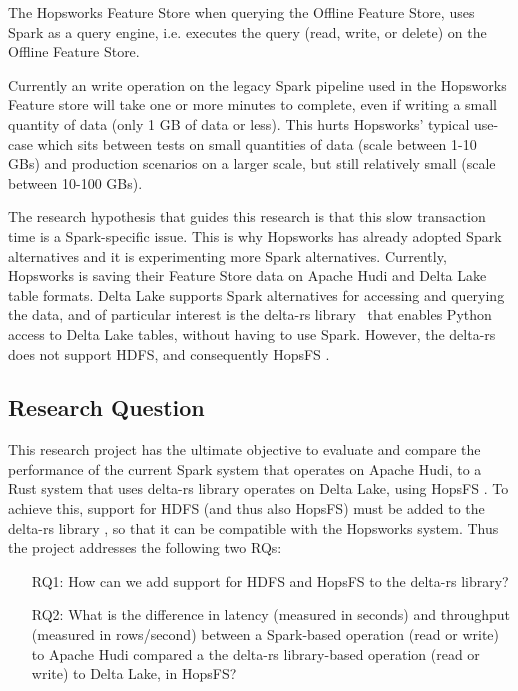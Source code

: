 The Hopsworks Feature Store \cite{HopsworksBatchRealtime2024} when querying the Offline Feature Store, uses Spark as a query engine, i.e. executes the query (read, write, or delete) on the Offline Feature Store.

Currently an write operation on the legacy Spark pipeline used in the Hopsworks Feature store will take one or more minutes to complete, even if writing a small quantity of data (only 1 GB of data or less).
This hurts Hopsworks' typical use-case which sits between tests on small quantities of data (scale between 1-10 GBs) and production scenarios on a larger scale, but still relatively small (scale between 10-100 GBs).

The research hypothesis that guides this research is that this slow transaction time is a Spark-specific issue. This is why Hopsworks has already adopted Spark alternatives \cite{Khazanchi1801362} and it is experimenting more Spark alternatives. Currently, Hopsworks is saving their Feature Store data on Apache Hudi and Delta Lake table formats. Delta Lake supports Spark alternatives for accessing and querying the data, and of particular interest is the delta-rs library~\cite{DeltaioDeltars2024} that enables Python access to Delta Lake tables, without having to use Spark. 
However, the delta-rs \cite{DeltaioDeltars2024} does not support \gls{HDFS}, and consequently \gls{HopsFS} \cite{niaziHopsFSScalingHierarchical2017}.

\subsection{Research Question}
\label{sec:researchQuestion}
This research project has the ultimate objective to evaluate and compare the performance of the current Spark system that operates on Apache Hudi, to a Rust system that uses delta-rs library \cite{DeltaioDeltars2024} operates on Delta Lake, using \gls{HopsFS} \cite{niaziHopsFSScalingHierarchical2017}. To achieve this, support for \gls{HDFS} (and thus also \gls{HopsFS}) must be added to the delta-rs library \cite{DeltaioDeltars2024}, so that it can be compatible with the Hopsworks system. Thus the project addresses the following two \glspl{RQ}:
\begin{enumerate}
    \item[RQ1:] How can we add support for \gls{HDFS} and \gls{HopsFS} to the delta-rs library?
    \item[RQ2:] What is the difference in latency (measured in seconds) and throughput (measured in rows/second) between a Spark-based operation (read or write) to Apache Hudi compared a the delta-rs library-based operation (read or write) to Delta Lake, in \gls{HopsFS}?  
\end{enumerate}


